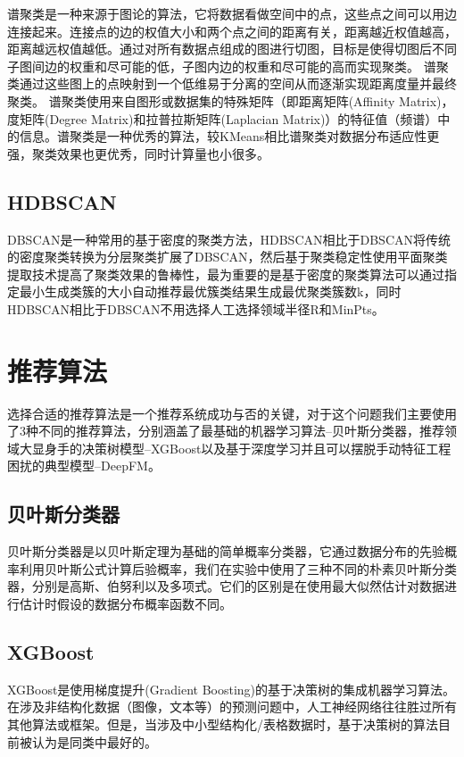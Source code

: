 谱聚类是一种来源于图论的算法，它将数据看做空间中的点，这些点之间可以用边连接起来。连接点的边的权值大小和两个点之间的距离有关，距离越近权值越高，距离越远权值越低。通过对所有数据点组成的图进行切图，目标是使得切图后不同子图间边的权重和尽可能的低，子图内边的权重和尽可能的高而实现聚类。
谱聚类通过这些图上的点映射到一个低维易于分离的空间从而逐渐实现距离度量并最终聚类。 谱聚类使用来自图形或数据集的特殊矩阵（即距离矩阵(Affinity Matrix)，度矩阵(Degree Matrix)和拉普拉斯矩阵(Laplacian Matrix)）的特征值（频谱）中的信息。谱聚类是一种优秀的算法，较KMeans相比谱聚类对数据分布适应性更强，聚类效果也更优秀，同时计算量也小很多。

\subsection{HDBSCAN}

DBSCAN是一种常用的基于密度的聚类方法，HDBSCAN相比于DBSCAN将传统的密度聚类转换为分层聚类扩展了DBSCAN，然后基于聚类稳定性使用平面聚类提取技术提高了聚类效果的鲁棒性，最为重要的是基于密度的聚类算法可以通过指定最小生成类簇的大小自动推荐最优簇类结果生成最优聚类簇数k，同时HDBSCAN相比于DBSCAN不用选择人工选择领域半径R和MinPts。

\section{推荐算法}

选择合适的推荐算法是一个推荐系统成功与否的关键，对于这个问题我们主要使用了3种不同的推荐算法，分别涵盖了最基础的机器学习算法--贝叶斯分类器，推荐领域大显身手的决策树模型--XGBoost以及基于深度学习并且可以摆脱手动特征工程困扰的典型模型--DeepFM。

\subsection{贝叶斯分类器}

贝叶斯分类器是以贝叶斯定理为基础的简单概率分类器，它通过数据分布的先验概率利用贝叶斯公式计算后验概率，我们在实验中使用了三种不同的朴素贝叶斯分类器，分别是高斯、伯努利以及多项式。它们的区别是在使用最大似然估计对数据进行估计时假设的数据分布概率函数不同。

\subsection{XGBoost}

XGBoost是使用梯度提升(Gradient Boosting)的基于决策树的集成机器学习算法。在涉及非结构化数据（图像，文本等）的预测问题中，人工神经网络往往胜过所有其他算法或框架。但是，当涉及中小型结构化/表格数据时，基于决策树的算法目前被认为是同类中最好的。

